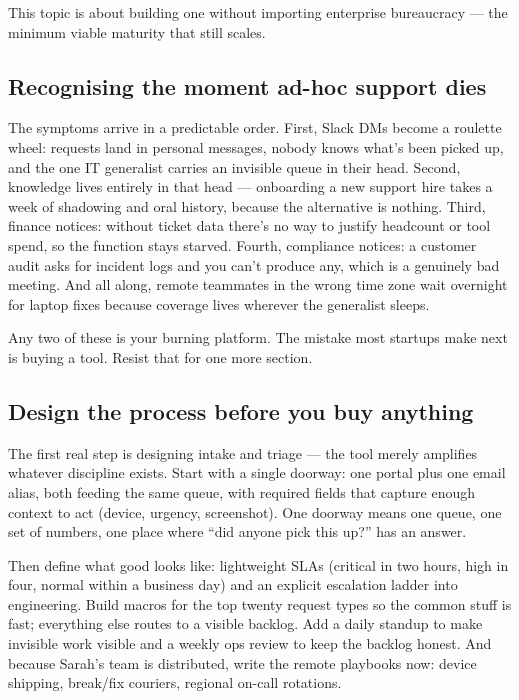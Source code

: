 This topic is about building one without importing enterprise bureaucracy — the minimum viable maturity that still scales.



\subsection{Recognising the moment ad-hoc support dies}


The symptoms arrive in a predictable order. First, Slack DMs become a roulette wheel: requests land in personal messages, nobody knows what's been picked up, and the one IT generalist carries an invisible queue in their head. Second, knowledge lives entirely in that head — onboarding a new support hire takes a week of shadowing and oral history, because the alternative is nothing. Third, finance notices: without ticket data there's no way to justify headcount or tool spend, so the function stays starved. Fourth, compliance notices: a customer audit asks for incident logs and you can't produce any, which is a genuinely bad meeting. And all along, remote teammates in the wrong time zone wait overnight for laptop fixes because coverage lives wherever the generalist sleeps.


Any two of these is your burning platform. The mistake most startups make next is buying a tool. Resist that for one more section.



\subsection{Design the process before you buy anything}


The first real step is designing intake and triage — the tool merely amplifies whatever discipline exists. Start with a single doorway: one portal plus one email alias, both feeding the same queue, with required fields that capture enough context to act (device, urgency, screenshot). One doorway means one queue, one set of numbers, one place where ``did anyone pick this up?'' has an answer.


Then define what good looks like: lightweight SLAs (critical in two hours, high in four, normal within a business day) and an explicit escalation ladder into engineering. Build macros for the top twenty request types so the common stuff is fast; everything else routes to a visible backlog. Add a daily standup to make invisible work visible and a weekly ops review to keep the backlog honest. And because Sarah's team is distributed, write the remote playbooks now: device shipping, break/fix couriers, regional on-call rotations.



